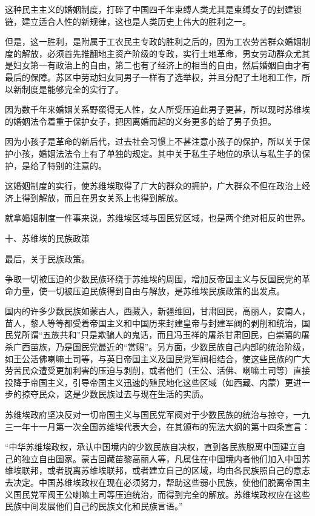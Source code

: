 这种民主主义的婚姻制度，打碎了中国四千年束缚人类尤其是束缚女子的封建锁链，建立适合人性的新规律，这也是人类历史上伟大的胜利之一。

但是，这一胜利，是附属于工农民主专政的胜利之后的，因为工农劳苦群众婚姻制度的解放，必须首先推翻地主资产阶级的专政，实行土地革命，男女劳动群众尤其是妇女第一有政治上的自由，第二也有了经济上的相当的自由，然后婚姻自由才有最后的保障。苏区中劳动妇女同男子一样有了选举权，并且分配了土地和工作，所以新制度是能够完全的实行了。

因为数千年来婚姻关系野蛮得无人性，女人所受压迫此男子更甚，所以现时苏维埃的婚姻法令着重于保护女子，把因离婚而起的义务更多的给了男子负担。

因为小孩子是革命的新后代，过去社会习惯上不甚注意小孩子的保护，所以关于保护小孩，婚姻法法令上有了单独的规定。其中关于私生子地位的承认与私生子的保护，是给了特别的注意的。

这婚姻制度的实行，使苏维埃取得了广大的群众的拥护，广大群众不但在政治上经济上得到解放，而且在男女关系上也得到解放。

就拿婚姻制度一件事来说，苏维埃区域与国民党区域，也是两个绝对相反的世界。

十、苏维埃的民族政策

最后，关于民族政策。

争取一切被压迫的少数民族环绕于苏维埃的周围，增加反帝国主义与反国民党的革命力量，使一切被压迫民族得到自由与解放，是苏维埃民族政策的出发点。

国内的许多少数民族如蒙古人，西藏入，新疆维回，甘肃回民，高丽人，安南人，苗人，黎人等等都受着帝国主义和中国历来封建皇帝与封建军阀的剥削和统治，国民党所谓“五族共和”只是欺骗人的鬼话，而且冯玉祥的屠杀甘肃回民，白崇禧的屠杀广西苗族，乃是国民党最近的“赏赐”。另方面，少数民族自己内部的统治阶级，如王公活佛喇嘛土司等，与英日帝国主义及国民党军阀相结合，使这些民族的广大劳苦民众遭受更加利害的压迫与剥削，或者他们（王公、活佛、喇嘛土司等）直接投降于帝国主义，引导帝国主义迅速的殖民地化这些区域（如西藏、内蒙）更进一步的掠夺民众，这是少数民族过去与现在生活的实质。

苏维埃政府坚决反对一切帝国主义与国民党军阀对于少数民族的统治与掠夺，一九三一年十一月第一次全国苏维埃代表大会，在其颁布的宪法大纲的第十四条宣言：

“中华苏维埃政权，承认中国境内的少数民族自决权，直到各民族脱离中国建立自己的独立自由国家。蒙古回藏苗黎高丽人等，凡属住在中国境内者他们加入中国苏维埃联邦，或者脱离苏维埃联邦，或者建立自己的区域，均由各民族照自己的意志去决定。中国苏维埃政权在现在必须努力，帮助这些弱小民族，使他们脱离帝国主义国民党军阀王公喇嘛土司等压迫统治，而得到完全的解放。苏维埃政权应在这些民族中间发展他们自己的民族文化和民族言语。”

